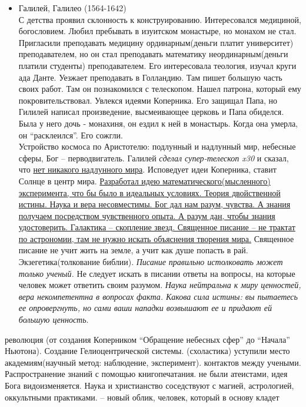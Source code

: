 \documentclass[a4paper,12pt]{report} %
\begin{document}
\begin{itemize}
\begin{itemize}
\item Галилей, Галилео (1564-1642)\\
С детства проявил склонность к конструированию. Интересовался
медициной, богословием. Любил пребывать в изуитском монастыре, но
монахом не стал. Пригласили преподавать медицину ординарным(деньги
платит университет)
преподавателем, но он стал преподавать математику
неординарным(деньги платили студенты)
преподавателем. Его интересовала теология, изучал круги ада
Данте. Уезжает преподавать в Голландию. Там пишет большую часть своих
работ. Там он познакомился с телескопом. Нашел патрона, который ему
покровительствовал. Увлекся идеями Коперника. Его защищал Папа, но
Гилилей написал произведение, высмеивающее церковь и Папа
обиделся. Была у него дочь - монахиня, он ездил к ней в
монастырь. Когда она умерла, он ``расклеился''. Его сожгли.\\
Устройство космоса по Аристотелю: подлунный и надлунный мир, небесные
сферы, Бог -- перводвигатель. Галилей \textit{сделал супер-телескоп x30} и сказал,
что \underline{нет никакого надлунного мира}. Исповедует идеи Коперника,
ставит Солнце в центр мира. \underline{Разработал идею
математического(мысленного) эксперимента, что бы было в идеальных
условиях. Теория двойственной истины. Наука и вера несовместимы. Бог
дал нам разум, чувства. А знания получаем посредством чувственного
опыта. А разум дан, чтобы знания удостоверить. Галактика -- скопление
звезд. Священное писание -- не трактат по астрономии, там не нужно
искать объяснения творения мира.} Священное писание не учит жить на
земле, а учит как душе попасть в рай. Экзегетика(толкование
библии). \textit{Писание правильно истолковать может только ученый.}
Не следует искать в писании ответы на вопросы, на которые человек
может ответить своим разумом. \textit{Наука нейтральна к миру ценностей, вера
некомпетентна в вопросах факта. Какова сила истины: вы пытаетесь ее
опровергнуть, но сами ваши нападки возвышают ее и придают ей большую ценность}.
\end{itemize}
\begin{enumerate}
 революция (от создания Коперником ``Обращение небесных сфер''
до ``Начала'' Ньютона). Создание Гелиоцентрической системы.
(схоластика) уступили место академиям(научный метод:
  наблюдение, эксперимент).
 контактов между учеными. Распространение знаний с
  помощью книгопечатания.
 не были атеистами, идея Бога видоизменяется. Наука и
  христианство соседствуют с магией, астрологией, оккультными
  практиками.
 -- новый облик, человек, который в основу кладет

\end{enumerate}
\end{itemize}
\end{document}
